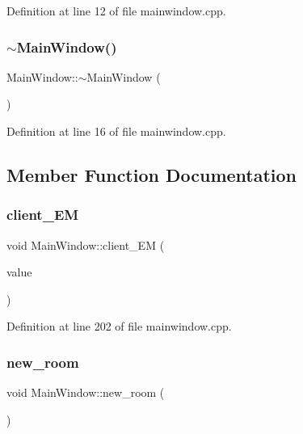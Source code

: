 Definition at line 12 of file mainwindow.\+cpp.

\mbox{\label{class_main_window_ae98d00a93bc118200eeef9f9bba1dba7}} 
\subsubsection{\texorpdfstring{$\sim$\+Main\+Window()}{~MainWindow()}}
{\footnotesize\ttfamily Main\+Window\+::$\sim$\+Main\+Window (\begin{DoxyParamCaption}{ }\end{DoxyParamCaption})}



Definition at line 16 of file mainwindow.\+cpp.



\subsection{Member Function Documentation}
\mbox{\label{class_main_window_a413ee43572e60199c3c05beb320a49bb}} 
\subsubsection{\texorpdfstring{client\+\_\+\+EM}{client\_EM}}
{\footnotesize\ttfamily void Main\+Window\+::client\+\_\+\+EM (\begin{DoxyParamCaption}\item[{Q\+String}]{value }\end{DoxyParamCaption})\hspace{0.3cm}{\ttfamily [slot]}}



Definition at line 202 of file mainwindow.\+cpp.

\mbox{\label{class_main_window_a009cf1c98aea483a7e69beadd37198fc}} 
\subsubsection{\texorpdfstring{new\+\_\+room}{new\_room}}
{\footnotesize\ttfamily void Main\+Window\+::new\+\_\+room (\begin{DoxyParamCaption}{ }\end{DoxyParamCaption})\hspace{0.3cm}{\ttfamily [slot]}}



